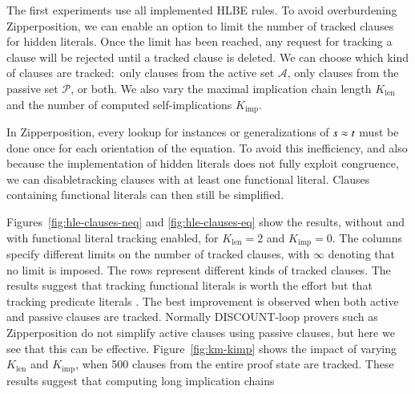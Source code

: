 % 
The first experiments use all implemented HLBE rules.
To avoid overburdening Zipperposition, we can enable an option to limit the
number of tracked clauses for hidden literals. Once the limit has been reached, any
request for tracking a clause will be rejected until a tracked
clause is deleted. We can choose which kind of clauses are
tracked:\ only clauses from the active set $\mathcal{A}$,
only clauses from the passive set $\mathcal{P}$, or both.
We also vary the maximal implication chain length $K_\mathrm{len}$ and the
number of computed self-implications $K_\mathrm{imp}$.

In Zipperposition, every lookup for instances or generalizations of
$s \approx t$ must be done once for each orientation of the equation.
To avoid this inefficiency, and also because the implementation of hidden literals does not fully
exploit congruence, we can disable\pagebreak[2] tracking clauses with at least one
functional literal. Clauses containing functional literals can then still be
simplified.

Figures~\ref{fig:hle-clauses-neq} and \ref{fig:hle-clauses-eq}
show the results, without and with functional literal tracking enabled,
for $K_\mathrm{len} = 2$ and $K_\mathrm{imp} = 0$.
The columns specify different limits on the number of tracked clauses, with $\infty$
denoting that no limit is imposed. The rows represent different kinds of tracked clauses.
The results suggest that tracking functional literals is  worth the effort
but that tracking predicate literals . The best improvement is observed when
both active and passive clauses are tracked. Normally DISCOUNT-loop
provers \cite{adf-1995-discount} such as Zipperposition do not simplify
active clauses using passive clauses, but here we see that this can be effective.
%
Figure~\ref{fig:km-kimp} shows the impact of varying $K_\mathrm{len}$ and
$K_\mathrm{imp}$, when 500 clauses from the entire proof state are tracked.
These results suggest that computing long implication chains 

